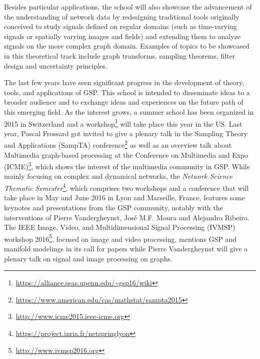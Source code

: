 \documentclass[a4paper]{scrartcl}
\begin{document}
Besides particular applications, the school will also showcase the advancement
of the understanding of network data by redesigning traditional tools originally
conceived to study signals defined on regular domains (such as time-varying
signals or spatially varying images and fields) and extending them to analyze
signals on the more complex graph domain. Examples of topics to be showcased in
this theoretical track include graph transforms, sampling theorems, filter
design and uncertainty principles.

The last few years have seen significant progress in the development of theory,
tools, and applications of GSP. This school is intended to disseminate ideas to
a broader audience and to exchange ideas and experiences on the future path of
this emerging field. As the interest grows, a summer school has been organized
in 2015 in Switzerland and a
workshop\footnote{\url{https://alliance.seas.upenn.edu/~gsp16/wiki}} will take
place this year in the US. Last year, Pascal Frossard got invited to give a
plenary talk in the Sampling Theory and Applications (SampTA)
conference\footnote{\url{https://www.american.edu/cas/mathstat/sampta2015}} as
well as an overview talk about Multimedia graph-based processing at the
Conference on Multimedia and Expo
(ICME)\footnote{\url{http://www.icme2015.ieee-icme.org}}, which shows the
interest of the multimedia community in GSP.  While mainly focusing on complex
and dynamical networks, the \textit{Network Science Thematic
Semester}\footnote{\url{https://project.inria.fr/netspringlyon}}, which
comprises two workshops and a conference that will take place in May and June
2016 in Lyon and Marseille, France, features some keynotes and presentations
from the GSP community, notably with the interventions of Pierre Vandergheynst,
José M.F. Moura and Alejandro Ribeiro. The IEEE Image, Video, and
Multidimensional Signal Processing (IVMSP) workshop
2016\footnote{\url{http://www.ivmsp2016.org}}, focused on image and video
processing, mentions GSP and manifold modelings in its call for papers while
Pierre Vandergheynst will give a plenary talk on signal and image processing on
graphs.
\end{document}
